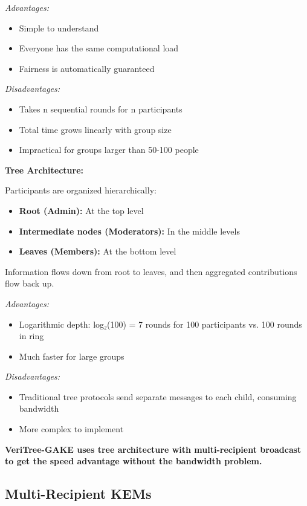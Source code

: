 \documentclass[12pt,a4paper]{report}
\begin{document}
\textit{Advantages:}
\begin{itemize}
\item Simple to understand
\item Everyone has the same computational load
\item Fairness is automatically guaranteed
\end{itemize}

\textit{Disadvantages:}
\begin{itemize}
\item Takes n sequential rounds for n participants
\item Total time grows linearly with group size
\item Impractical for groups larger than 50-100 people
\end{itemize}

\textbf{Tree Architecture:}

Participants are organized hierarchically:
\begin{itemize}
\item \textbf{Root (Admin):} At the top level
\item \textbf{Intermediate nodes (Moderators):} In the middle levels
\item \textbf{Leaves (Members):} At the bottom level
\end{itemize}

Information flows down from root to leaves, and then aggregated contributions flow back up.

\textit{Advantages:}
\begin{itemize}
\item Logarithmic depth: log₂(100) = 7 rounds for 100 participants vs. 100 rounds in ring
\item Much faster for large groups
\end{itemize}

\textit{Disadvantages:}
\begin{itemize}
\item Traditional tree protocols send separate messages to each child, consuming bandwidth
\item More complex to implement
\end{itemize}

\textbf{VeriTree-GAKE uses tree architecture with multi-recipient broadcast to get the speed advantage without the bandwidth problem.}

\subsection{Multi-Recipient KEMs}
\end{document}
